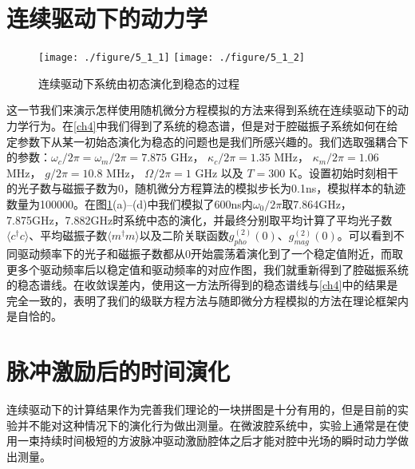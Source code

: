 \section{连续驱动下的动力学}
\begin{figure}[htbp]
	\centering
	\texttt{[image: ./figure/5\_1\_1]}
	\texttt{[image: ./figure/5\_1\_2]}
	\caption{连续驱动下系统由初态演化到稳态的过程} 
	\label{ContinuiousDrive2edOrder}
\end{figure}
这一节我们来演示怎样使用随机微分方程模拟的方法来得到系统在连续驱动下的动力学行为。在\ref{ch4}中我们得到了系统的稳态谱，但是对于腔磁振子系统如何在给定参数下从某一初始态演化为稳态的问题也是我们所感兴趣的。我们选取强耦合下的参数：$\omega_c/2\pi=\omega_m/2\pi=7.875$ GHz， $\kappa_c/2\pi=1.35$ MHz， $\kappa_m/2\pi=1.06$ MHz， $g/2\pi=10.8$ MHz， $\Omega/2\pi=1$ GHz 以及 $T=300$ K。设置初始时刻相干的光子数与磁振子数为0，随机微分方程算法的模拟步长为0.1ns，模拟样本的轨迹数量为100000。在图\ref{ContinuiousDrive2edOrder}(a)--(d)中我们模拟了600ns内$\omega_0/2\pi$取7.864GHz，7.875GHz，7.882GHz时系统中态的演化，并最终分别取平均计算了平均光子数$\langle c^{\dag}c\rangle$、平均磁振子数$\langle m^{\dag}m\rangle$以及二阶关联函数$g_{pho}^{(2)}(0)$、$g_{mag}^{(2)}(0)$。可以看到不同驱动频率下的光子和磁振子数都从0开始震荡着演化到了一个稳定值附近，而取更多个驱动频率后以稳定值和驱动频率的对应作图，我们就重新得到了腔磁振系统的稳态谱线。在收敛误差内，使用这一方法所得到的稳态谱线与\ref{ch4}中的结果是完全一致的，表明了我们的级联方程方法与随即微分方程模拟的方法在理论框架内是自恰的。

\section{脉冲激励后的时间演化}
连续驱动下的计算结果作为完善我们理论的一块拼图是十分有用的，但是目前的实验并不能对这种情况下的演化行为做出测量。在微波腔系统中，实验上通常是在使用一束持续时间极短的方波脉冲驱动激励腔体之后才能对腔中光场的瞬时动力学做出测量\cite{PhysRevLett.113.156401Tang,PhysRevB.99.134445Hu}。

